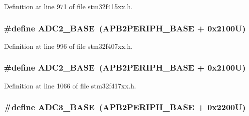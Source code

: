 Definition at line 971 of file stm32f415xx.\+h.

\subsubsection[{\texorpdfstring{A\+D\+C2\+\_\+\+B\+A\+SE}{ADC2_BASE}}]{\setlength{\rightskip}{0pt plus 5cm}\#define A\+D\+C2\+\_\+\+B\+A\+SE~({\bf A\+P\+B2\+P\+E\+R\+I\+P\+H\+\_\+\+B\+A\+SE} + 0x2100\+U)}\hypertarget{group___peripheral__registers__structures_ga6544abc57f9759f610eee09a02442ae6}{}\label{group___peripheral__registers__structures_ga6544abc57f9759f610eee09a02442ae6}


Definition at line 996 of file stm32f407xx.\+h.

\subsubsection[{\texorpdfstring{A\+D\+C2\+\_\+\+B\+A\+SE}{ADC2_BASE}}]{\setlength{\rightskip}{0pt plus 5cm}\#define A\+D\+C2\+\_\+\+B\+A\+SE~({\bf A\+P\+B2\+P\+E\+R\+I\+P\+H\+\_\+\+B\+A\+SE} + 0x2100\+U)}\hypertarget{group___peripheral__registers__structures_ga6544abc57f9759f610eee09a02442ae6}{}\label{group___peripheral__registers__structures_ga6544abc57f9759f610eee09a02442ae6}


Definition at line 1066 of file stm32f417xx.\+h.

\subsubsection[{\texorpdfstring{A\+D\+C3\+\_\+\+B\+A\+SE}{ADC3_BASE}}]{\setlength{\rightskip}{0pt plus 5cm}\#define A\+D\+C3\+\_\+\+B\+A\+SE~({\bf A\+P\+B2\+P\+E\+R\+I\+P\+H\+\_\+\+B\+A\+SE} + 0x2200\+U)}\hypertarget{group___peripheral__registers__structures_gaca766f86c8e0b00a8e2b0224dcbb4c82}{}\label{group___peripheral__registers__structures_gaca766f86c8e0b00a8e2b0224dcbb4c82}


